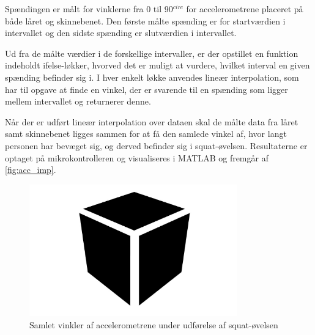 Spændingen er målt for vinklerne fra 0 til 90$^{circ}$ for accelerometrene placeret på både låret og skinnebenet. Den første målte spænding er for startværdien i intervallet og den sidste spænding er slutværdien i intervallet.

Ud fra de målte værdier i de forskellige intervaller, er der opstillet en funktion indeholdt ifelse-løkker, hvorved det er muligt at vurdere, hvilket interval en given spænding befinder sig i. I hver enkelt løkke anvendes lineær interpolation, som har til opgave at finde en vinkel, der er svarende til en spænding som ligger mellem intervallet og returnerer denne. 

Når der er udført lineær interpolation over dataen skal de målte data fra låret samt skinnebenet ligges sammen for at få den samlede vinkel af, hvor langt personen har bevæget sig, og derved befinder sig i squat-øvelsen. Resultaterne er optaget på mikrokontrolleren og visualiseres i MATLAB og fremgår af \autoref{fig:acc_imp}.
 

\begin{figure}[H]
\centering
\includegraphics[width=0.8\textwidth]{figures/Pilotforsoeg/blackbox}
\caption{Samlet vinkler af accelerometrene under udførelse af squat-øvelsen}
\label{fig:acc_imp}
\end{figure}




